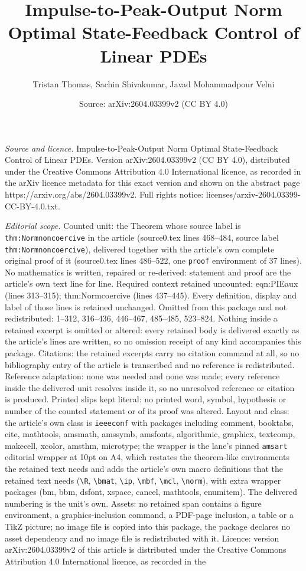 \documentclass[10pt,a4paper]{amsart}
\title[Impulse-to-Peak-Output Norm Optimal State-Feedback Control o]{Impulse-to-Peak-Output Norm Optimal State-Feedback Control of Linear PDEs}
\author{Tristan Thomas, Sachin Shivakumar, Javad Mohammadpour Velni}
\date{Source: arXiv:2604.03399v2 (CC BY 4.0)}
\begin{document}
\maketitle

\noindent\emph{Source and licence.} Impulse-to-Peak-Output Norm Optimal State-Feedback Control of Linear PDEs. Version arXiv:2604.03399v2 (CC BY 4.0), distributed under the Creative Commons Attribution 4.0 International licence, as recorded in the arXiv licence metadata for this exact version and shown on the abstract page https://arxiv.org/abs/2604.03399v2. Full rights notice: licenses/arxiv-2604.03399-CC-BY-4.0.txt.\par\smallskip

\noindent\textit{Editorial scope.} Counted unit: the Theorem whose source label is \texttt{thm:Normnoncoercive} in the article (source0.tex lines 468--484, source label \texttt{thm:Normnoncoercive}), delivered together with the article's own complete original proof of it (source0.tex lines 486--522, one \texttt{proof} environment of 37 lines). No mathematics is written, repaired or re-derived: statement and proof are the article's own text line for line. Required context retained uncounted: eqn:PIEaux (lines 313--315); thm:Normcoercive (lines 437--445). Every definition, display and label of those lines is retained unchanged. Omitted from this package and not redistributed: 1--312, 316--436, 446--467, 485--485, 523--824. Nothing inside a retained excerpt is omitted or altered: every retained body is delivered exactly as the article's lines are written, so no omission receipt of any kind accompanies this package. Citations: the retained excerpts carry no citation command at all, so no bibliography entry of the article is transcribed and no reference is redistributed. Reference adaptation: none was needed and none was made; every reference inside the delivered unit resolves inside it, so no unresolved reference or citation is produced. Printed slips kept literal: no printed word, symbol, hypothesis or number of the counted statement or of its proof was altered. Layout and class: the article's own class is \texttt{ieeeconf} with packages including comment, booktabs, cite, mathtools, amsmath, amssymb, amsfonts, algorithmic, graphicx, textcomp, makecell, xcolor, amsthm, microtype; the wrapper is the lane's pinned \texttt{amsart} editorial wrapper at 10pt on A4, which restates the theorem-like environments the retained text needs and adds the article's own macro definitions that the retained text needs (\texttt{\textbackslash R}, \texttt{\textbackslash bmat}, \texttt{\textbackslash ip}, \texttt{\textbackslash mbf}, \texttt{\textbackslash mcl}, \texttt{\textbackslash norm}), with extra wrapper packages (bm, bbm, dsfont, xspace, cancel, mathtools, enumitem). The delivered numbering is the unit's own. Assets: no retained span contains a figure environment, a graphics-inclusion command, a PDF-page inclusion, a table or a TikZ picture; no image file is copied into this package, the package declares no asset dependency and no image file is redistributed with it. Licence: version arXiv:2604.03399v2 of this article is distributed under the Creative Commons Attribution 4.0 International licence, as recorded in the 
\end{document}
